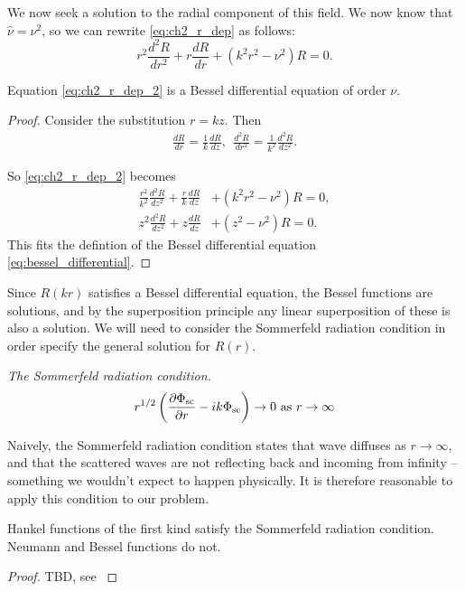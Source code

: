 We now seek a solution to the radial component of this field. We now know that $\hat{\nu} = \nu^2$, so we can rewrite \eqref{eq:ch2_r_dep} as follows:
    \begin{equation}\label{eq:ch2_r_dep_2}
        r^2 \frac{d^2 R}{dr^2} + r \frac{d R}{dr} + (k^2r^2 - \nu^2) R = 0.
    \end{equation}
    \begin{propn}
    Equation \eqref{eq:ch2_r_dep_2} is a Bessel differential equation of order $\nu$.
    \end{propn}
    \begin{proof} Consider the substitution $r=kz$. Then
        \begin{align*}
            \frac{dR}{dr} = \frac{1}{k} \frac{dR}{dz}, ~~
            \frac{d^2R}{dr^2} = \frac{1}{k^2} \frac{d^2R}{dz^2}.
        \end{align*}\par
    So \eqref{eq:ch2_r_dep_2} becomes
        \begin{align}
            \frac{r^2}{k^2}\frac{d^2R}{dz^2}
                + \frac{r}{k}\frac{dR}{dz}
                &+ (k^2r^2 - \nu^2)R = 0, \\
            z^2 \frac{d^2 R}{dz^2}
                + z \frac{dR}{dz}
                &+ (z^2 - \nu^2)R = 0.
        \end{align}
    This fits the defintion of the Bessel differential equation \eqref{eq:bessel_differential}.
    \end{proof}

Since $R(kr)$ satisfies a Bessel differential equation, the Bessel functions are solutions, and by the superposition principle any linear superposition of these is also a solution. We will need to consider the Sommerfeld radiation condition in order specify the general solution for $R(r)$.

\begin{defn}\emph{The Sommerfeld radiation condition.} \parencite{martin06scattering} \label{defn:sommerfeld_radiation_condition}
  \[ r^{1/2} \left( \frac{\partial \Phi_{\text{sc}}}{\partial r} - ik\Phi_{\text{sc}} \right) \rightarrow 0 \text{ as } r \rightarrow \infty\]
\end{defn}
Naively, the Sommerfeld radiation condition states that wave diffuses as $r\rightarrow\infty$, and that the scattered waves are not reflecting back and incoming from infinity -- something we wouldn't expect to happen physically. It is therefore reasonable to apply this condition to our problem.

\begin{propn}
  Hankel functions of the first kind satisfy the Sommerfeld radiation condition. Neumann and Bessel functions do not.
\end{propn}
\begin{proof}
    TBD, see \parencite[$\S$4.2]{martin06scattering}
\end{proof}\par

